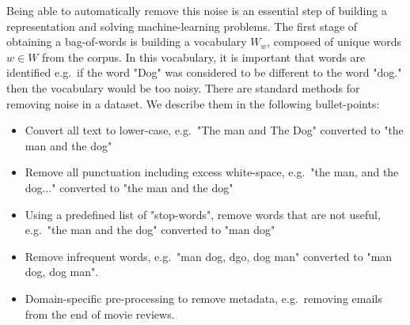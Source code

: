 



Being able to automatically remove this noise is an essential step of building a representation and solving machine-learning problems.  The first stage of obtaining a bag-of-words is building a vocabulary $W_w$, composed of unique words $w \in W$ from the corpus. In this vocabulary, it is important that words are identified e.g.\ if the word "Dog" was considered to be different to the word "dog." then the vocabulary would be too noisy. There are standard methods for removing noise in a dataset. We describe them in the following bullet-points: %

\begin{itemize}
	\item  Convert all text to lower-case, e.g.\ "The man and The Dog" converted to "the man and the dog"
	\item  Remove all punctuation including excess white-space, e.g.\ "the man, and the dog..." converted to "the man and the dog"
	\item Using a predefined list of "stop-words", remove words that are not useful, e.g.\ "the man and the dog" converted to "man dog"
	\item Remove infrequent words, e.g.\ "man dog, dgo, dog man" converted to "man dog, dog man".
	\item Domain-specific pre-processing to remove metadata, e.g.\ removing emails from the end of movie reviews.
\end{itemize}






